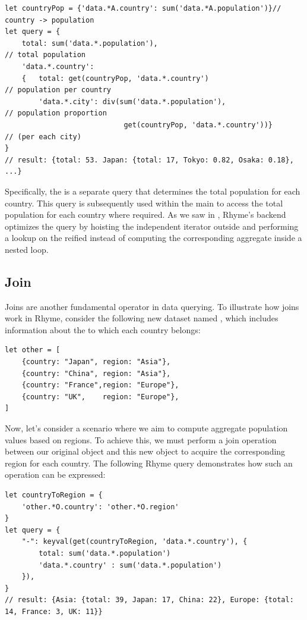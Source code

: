 \documentclass[runningheads]{llncs}
\newcommand{\lang}{Rhyme}
\begin{document}
\begin{lstlisting}[style=JavaScript, columns=flexible, numbers=none]
let countryPop = {'data.*A.country': sum('data.*A.population')}// country -> population
let query = { 
    total: sum('data.*.population'),                                  // total population
    'data.*.country':
    {   total: get(countryPop, 'data.*.country')                      // population per country
        'data.*.city': div(sum('data.*.population'),                  // population proportion
                            get(countryPop, 'data.*.country'))}       // (per each city)
}
// result: {total: 53. Japan: {total: 17, Tokyo: 0.82, Osaka: 0.18}, ...}
\end{lstlisting}

Specifically, the  is a separate query that determines the total
population for each country.
This query is subsequently used within the main  to access the
total population for each country where required.
As we saw in , \lang{}'s backend optimizes the
query by hoisting the independent  iterator outside and performing
a lookup on the reified  instead of computing the
corresponding aggregate inside a nested loop.

\subsection{Join}
Joins are another fundamental operator in data querying.
To illustrate how joins work in \lang{}, consider the following
new dataset named , which includes information about the
 to which each country belongs:

\begin{lstlisting}[style=JavaScript, columns=flexible]
let other = [
    {country: "Japan", region: "Asia"},
    {country: "China", region: "Asia"},
    {country: "France",region: "Europe"},
    {country: "UK",    region: "Europe"},
]
\end{lstlisting}

Now, let's consider a scenario where we aim to compute aggregate population
values based on regions.
To achieve this, we must perform a join operation between our original
 object and this new  object to acquire the
corresponding region for each country.
The following \lang{} query demonstrates how such an operation can be
expressed:

\begin{lstlisting}[style=JavaScript, columns=flexible]
let countryToRegion = {
    'other.*O.country': 'other.*O.region'
}
let query = {
    "-": keyval(get(countryToRegion, 'data.*.country'), {
        total: sum('data.*.population')
        'data.*.country' : sum('data.*.population')
    }),
}
// result: {Asia: {total: 39, Japan: 17, China: 22}, Europe: {total: 14, France: 3, UK: 11}}
\end{lstlisting}
\end{document}
